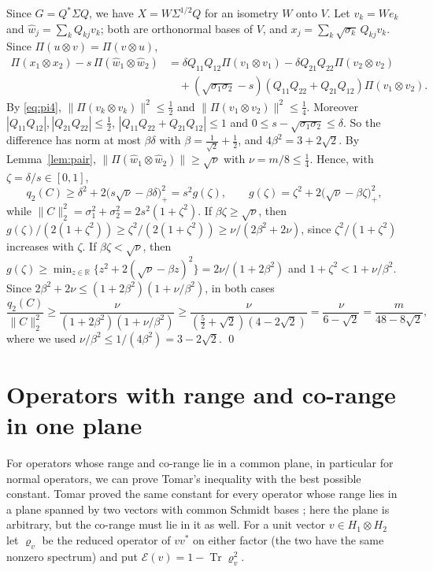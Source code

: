 \documentclass[11pt]{article}
\theoremstyle{remark}
\newcommand{\Tr}{\operatorname{Tr}}
\newcommand{\norm}[1]{\lVert #1\rVert}
\begin{document}
Since $G=Q^*\Sigma Q$, we have $X=W\Sigma^{1/2}Q$ for an isometry $W$ onto $V$. Let $v_k=We_k$ and
$\hat w_j=\sum_kQ_{kj}v_k$; both are orthonormal bases of $V$, and $x_j=\sum_k\sqrt{\sigma_k}\,Q_{kj}v_k$. Since
$\Pi(u\otimes v)=\Pi(v\otimes u)$,
\begin{align*}
\Pi(x_1\otimes x_2)-s\,\Pi(\hat w_1\otimes\hat w_2)
&=\delta Q_{11}Q_{12}\Pi(v_1\otimes v_1)-\delta Q_{21}Q_{22}\Pi(v_2\otimes v_2)\\
&\quad+(\sqrt{\sigma_1\sigma_2}-s)(Q_{11}Q_{22}+Q_{21}Q_{12})\Pi(v_1\otimes v_2).
\end{align*}
By \eqref{eq:pi4}, $\norm{\Pi(v_k\otimes v_k)}^2\le\frac12$ and $\norm{\Pi(v_1\otimes v_2)}^2\le\frac14$. Moreover
$|Q_{11}Q_{12}|,|Q_{21}Q_{22}|\le\frac12$, $|Q_{11}Q_{22}+Q_{21}Q_{12}|\le1$ and $0\le s-\sqrt{\sigma_1\sigma_2}\le\delta$.
So the difference has norm at most $\beta\delta$ with $\beta=\frac1{\sqrt2}+\frac12$, and $4\beta^2=3+2\sqrt2$. By
Lemma~\ref{lem:pair}, $\norm{\Pi(\hat w_1\otimes\hat w_2)}\ge\sqrt\nu$ with $\nu=m/8\le\frac14$. Hence, with
$\zeta=\delta/s\in[0,1]$,
\[
q_2(C)\ge\delta^2+2\big(s\sqrt\nu-\beta\delta\big)_+^2=s^2g(\zeta),\qquad g(\zeta)=\zeta^2+2\big(\sqrt\nu-\beta\zeta\big)_+^2,
\]
while $\norm{C}_2^2=\sigma_1^2+\sigma_2^2=2s^2(1+\zeta^2)$. If $\beta\zeta\ge\sqrt\nu$, then
$g(\zeta)/(2(1+\zeta^2))\ge\zeta^2/(2(1+\zeta^2))\ge\nu/(2\beta^2+2\nu)$, since $\zeta^2/(1+\zeta^2)$ increases with
$\zeta$. If $\beta\zeta<\sqrt\nu$, then $g(\zeta)\ge\min_{z\in\mathbb R}\{z^2+2(\sqrt\nu-\beta z)^2\}=2\nu/(1+2\beta^2)$
and $1+\zeta^2<1+\nu/\beta^2$. Since $2\beta^2+2\nu\le(1+2\beta^2)(1+\nu/\beta^2)$, in both cases
\[
\frac{q_2(C)}{\norm{C}_2^2}\ge\frac{\nu}{(1+2\beta^2)(1+\nu/\beta^2)}
\ge\frac{\nu}{(\frac52+\sqrt2)(4-2\sqrt2)}=\frac{\nu}{6-\sqrt2}=\frac{m}{48-8\sqrt2},
\]
where we used $\nu/\beta^2\le1/(4\beta^2)=3-2\sqrt2$. \qed

\section{Operators with range and co-range in one plane}\label{sec:normal}

For operators whose range and co-range lie in a common plane, in particular for normal operators, we can prove Tomar's
inequality with the best possible constant. Tomar proved the same constant for every operator whose range lies in a
plane spanned by two vectors with common Schmidt bases \cite[Thm.~7.2]{Tomar2}; here the plane is arbitrary, but the
co-range must lie in it as well. For a unit vector $v\in H_1\otimes H_2$ let $\varrho_v$ be the reduced
operator of $vv^*$ on either factor (the two have the same nonzero spectrum) and put $\mathcal E(v)=1-\Tr\varrho_v^2$.
\end{document}
